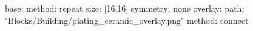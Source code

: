 base:
  method: repeat
  size: [16,16]
  symmetry: none
overlay:
  path: "Blocks/Building/plating_ceramic_overlay.png"
  method: connect